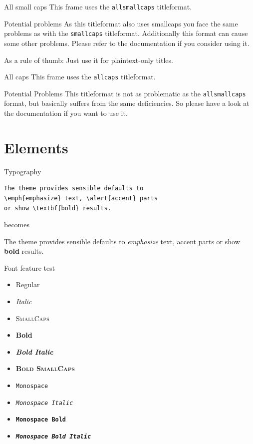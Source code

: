 \documentclass[10pt]{beamer}
\begin{document}
{
\begin{frame}{All small caps}
	This frame uses the \texttt{allsmallcaps} titleformat.

	\begin{alertblock}{Potential problems}
		As this titleformat also uses smallcaps you face the same problems as with the \texttt{smallcaps} titleformat. Additionally this format can cause some other problems. Please refer to the documentation if you consider using it.

		As a rule of thumb: Just use it for plaintext-only titles.
	\end{alertblock}
\end{frame}
}

{
\begin{frame}{All caps}
	This frame uses the \texttt{allcaps} titleformat.

	\begin{alertblock}{Potential Problems}
		This titleformat is not as problematic as the \texttt{allsmallcaps} format, but basically suffers from the same deficiencies. So please have a look at the documentation if you want to use it.
	\end{alertblock}
\end{frame}
}

\section{Elements}

\begin{frame}[fragile]{Typography}
      \begin{verbatim}The theme provides sensible defaults to
\emph{emphasize} text, \alert{accent} parts
or show \textbf{bold} results.\end{verbatim}

  \begin{center}becomes\end{center}

  The theme provides sensible defaults to \emph{emphasize} text,
  \alert{accent} parts or show \textbf{bold} results.
\end{frame}

\begin{frame}{Font feature test}
  \begin{itemize}
    \item Regular
    \item \textit{Italic}
    \item \textsc{SmallCaps}
    \item \textbf{Bold}
    \item \textbf{\textit{Bold Italic}}
    \item \textbf{\textsc{Bold SmallCaps}}
    \item \texttt{Monospace}
    \item \texttt{\textit{Monospace Italic}}
    \item \texttt{\textbf{Monospace Bold}}
    \item \texttt{\textbf{\textit{Monospace Bold Italic}}}
  \end{itemize}
\end{frame}
\end{document}
